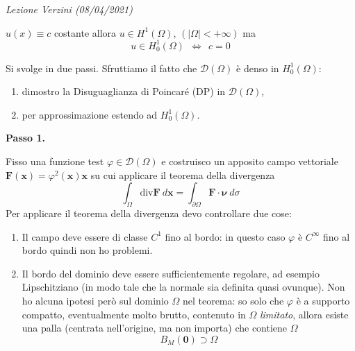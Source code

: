 \documentclass[10pt,a4paper,twoside,openright]{book}
\newcommand{\x}{\mathbf{x}}
\newcounter{conteggioV}
\newcommand{\LezioneV}[1]{
	\stepcounter{conteggioV}
	\textit{Lezione Verzini \arabic{conteggioV} (#1)}
	}
\begin{document}
\LezioneV{08/04/2021}
\begin{oss}
	$\displaystyle u( x) \equiv c$ costante allora $\displaystyle u\in H^{1}( \Omega )$, $\displaystyle ( |\Omega |< +\infty )$ ma
	\begin{equation*}
		u\in H_{0}^{1}( \Omega ) \ \ \Leftrightarrow \ \ c=0
	\end{equation*}
\end{oss}
\begin{dimostrazione}
	Si svolge in due passi. Sfruttiamo il fatto che $\displaystyle \mathcal{D}( \Omega )$ è denso in $\displaystyle H_{0}^{1}( \Omega )$:
	\begin{enumerate}
		\item dimostro la Disuguaglianza di Poincaré (DP) in $\displaystyle \mathcal{D}( \Omega )$,
		\item per approssimazione estendo ad $\displaystyle H_{0}^{1}( \Omega )$.
	\end{enumerate}
	
	\textbf{Passo 1.}
	
	Fisso una funzione test $\displaystyle \varphi \in \mathcal{D}( \Omega )$ e costruisco un apposito campo vettoriale $\displaystyle \mathbf{F}(\x) =\varphi ^{2}(\x)\x$ su cui applicare il teorema della divergenza
	\begin{equation*}
		\int _{\Omega }\mathrm{div}\mathbf{F} \ d\x =\int _{\partial \Omega }\mathbf{F} \cdotp \bm{\nu } \ d\sigma 
	\end{equation*}
	Per applicare il teorema della divergenza devo controllare due cose:
	\begin{enumerate}
		\item Il campo deve essere di classe $\displaystyle C^{1}$ fino al bordo: in questo caso $\displaystyle \varphi $ è $\displaystyle C^{\infty }$ fino al bordo quindi non ho problemi.
		\item Il bordo del dominio deve essere sufficientemente regolare, ad esempio Lipschitziano (in modo tale che la normale sia definita quasi ovunque). Non ho alcuna ipotesi però sul dominio $\displaystyle \Omega $ nel teorema: so solo che $\displaystyle \varphi $ è a supporto compatto, eventualmente molto brutto, contenuto in $\displaystyle \Omega $ \textit{limitato}, allora esiste una palla (centrata nell'origine, ma non importa) che contiene $\displaystyle \Omega $
		      \begin{equation*}
		      	B_{M}(\mathbf{0}) \supset \Omega 
		      \end{equation*}
		      

\end{enumerate}
\end{dimostrazione}
\end{document}

